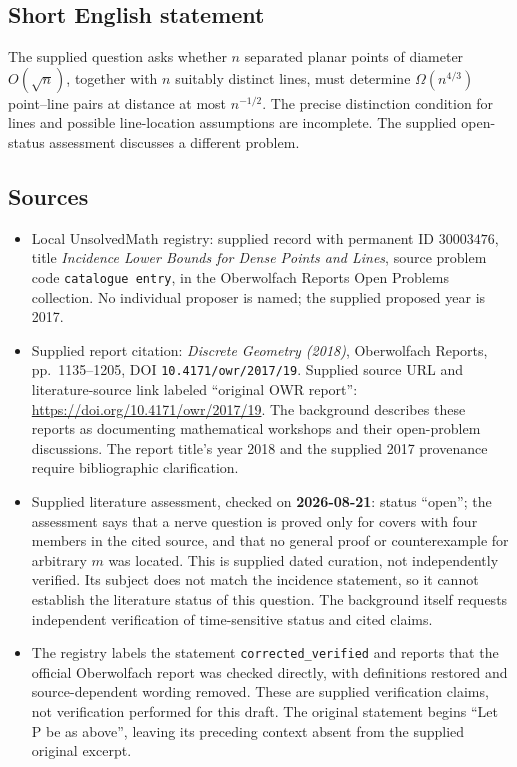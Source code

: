 \documentclass[11pt]{article}
\begin{document}
\subsection{Short English statement}
The supplied question asks whether \(n\) separated planar points of diameter \(O(\sqrt n)\), together with \(n\) suitably distinct lines, must determine \(\Omega(n^{4/3})\) point--line pairs at distance at most \(n^{-1/2}\). The precise distinction condition for lines and possible line-location assumptions are incomplete. The supplied open-status assessment discusses a different problem.
\subsection{Sources}
\begin{itemize}
\item Local UnsolvedMath registry: supplied record with permanent ID \(30003476\), title \emph{Incidence Lower Bounds for Dense Points and Lines}, source problem code \texttt{catalogue entry}, in the Oberwolfach Reports Open Problems collection. No individual proposer is named; the supplied proposed year is 2017.
\item Supplied report citation: \emph{Discrete Geometry (2018)}, Oberwolfach Reports, pp.~1135--1205, DOI \texttt{10.4171/owr/2017/19}. Supplied source URL and literature-source link labeled ``original OWR report'': \url{https://doi.org/10.4171/owr/2017/19}. The background describes these reports as documenting mathematical workshops and their open-problem discussions. The report title's year 2018 and the supplied 2017 provenance require bibliographic clarification.
\item Supplied literature assessment, checked on \textbf{2026-08-21}: status ``open''; the assessment says that a nerve question is proved only for covers with four members in the cited source, and that no general proof or counterexample for arbitrary \(m\) was located. This is supplied dated curation, not independently verified. Its subject does not match the incidence statement, so it cannot establish the literature status of this question. The background itself requests independent verification of time-sensitive status and cited claims.
\item The registry labels the statement \texttt{corrected\_verified} and reports that the official Oberwolfach report was checked directly, with definitions restored and source-dependent wording removed. These are supplied verification claims, not verification performed for this draft. The original statement begins ``Let P be as above'', leaving its preceding context absent from the supplied original excerpt.
\end{itemize}
\end{document}
